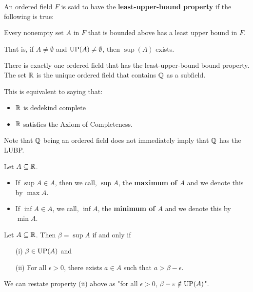 \documentclass[a4paper]{report}
\begin{document}
\begin{definition}
    An ordered field \( F  \) is said to have the \textbf{least-upper-bound property} if the following is true:
    \begin{center}
        Every nonempty set \( A  \) in \( F  \) that is bounded above has a least upper bound in \( F  \).
    \end{center}
    That is, if \( A \neq \emptyset  \) and \( \operatorname{UP}(A) \neq \emptyset \), then \( \sup (A) \) exists.
\end{definition}

\begin{theorem}[ ]
    There is exactly one ordered field that has the least-upper-bound bound property. The set \( \mathbb{R}  \) is the unique ordered field that contains \( \mathbb{Q}  \) as a subfield.
\end{theorem}
This is equivalent to saying that:

\begin{itemize}
    \item \( \mathbb{R}  \) is dedekind complete
    \item \( \mathbb{R}  \) satisfies the Axiom of Completeness.
\end{itemize}

\begin{remark}
   Note that \( \mathbb{Q}  \) being an ordered field does not immediately imply that \( \mathbb{Q}  \) has the LUBP.
\end{remark}

\begin{definition}
    Let \( A \subseteq \mathbb{R}  \).
    \begin{itemize}
        \item If \( \sup A \in A  \), then we call, \( \sup A  \), the \textbf{maximum of \( A  \)} and we denote this by \( \max A  \).
        \item If \( \inf A \in A  \), we call, \( \inf A  \), the \textbf{minimum of \( A  \)} and we denote this by \( \min A  \).
    \end{itemize}
\end{definition}


\begin{lemma}\label{First Useful Fact}
   Let \( A \subseteq \mathbb{R}  \). Then \( \beta = \sup A  \) if and only if   
   \begin{enumerate}
       \item[(i)] \( \beta \in \operatorname{UP}(A) \) and
        \item[(ii)] For all \( \epsilon > 0  \), there exists \( a \in A  \) such that \(a > \beta - \epsilon \).
   \end{enumerate}
\end{lemma}
\begin{remark}
    We can restate property (ii) above as "for all \( \epsilon > 0  \), \( \beta - \varepsilon \notin \operatorname{UP}(A) \)".
\end{remark}
\end{document}
